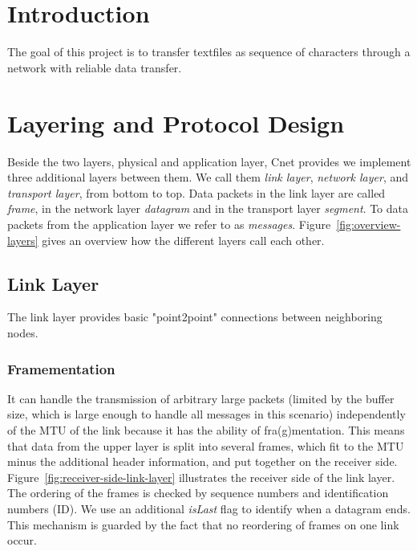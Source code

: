 
\title{\Large \lecture \\ \textbf{\normalsize \assignment}}
\author{\authors}

\setlength \headheight{25pt}
\fancyhead[L]{\authors}

\maketitle

\section{Introduction}
The goal of this project is to transfer textfiles as sequence of characters through a network with reliable data transfer. 

\section{Layering and Protocol Design}

Beside the two layers, physical and application layer, Cnet provides we implement three additional layers between them. We call them \emph{link layer}, \emph{network layer}, and \emph{transport layer}, from bottom to top. Data packets in the link layer are called \emph{frame}, in the network layer \emph{datagram} and in the transport layer \emph{segment}. To data packets from the application layer we refer to as \emph{messages}. Figure~\ref{fig:overview-layers} gives an overview how the different layers call each other.


\subsection{Link Layer}
  The link layer provides basic "point2point" connections between neighboring nodes. 

  \subsubsection{Framementation}
  It can handle the transmission of arbitrary large packets (limited by the buffer size, which is large enough to handle all messages in this scenario) independently of the MTU of the link because it has the ability of fra(g)mentation. This means that data from the upper layer is split into several frames, which fit to the MTU minus the additional header information, and put together on the receiver side. Figure~\ref{fig:receiver-side-link-layer} illustrates the receiver side of the link layer. The ordering of the frames is checked by sequence numbers and identification numbers (ID). We use an additional \emph{isLast} flag to identify when a datagram ends. This mechanism is guarded by the fact that no reordering of frames on one link occur. 

